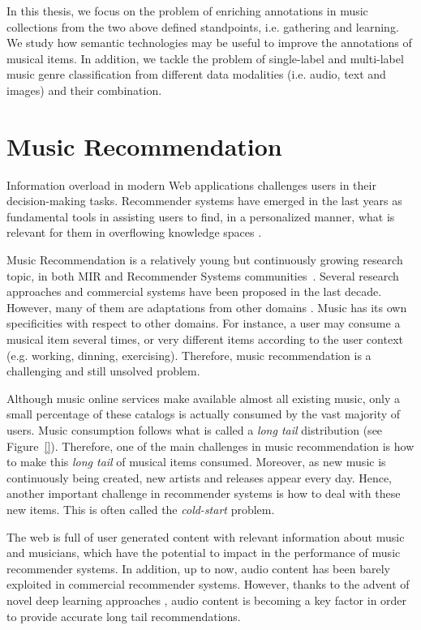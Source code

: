 In this thesis, we focus on the problem of enriching annotations in music collections from the two above defined standpoints, i.e. gathering and learning. We study how semantic technologies may be useful to improve the annotations of musical items. In addition, we tackle the problem of single-label and multi-label music genre classification from different data modalities (i.e. audio, text and images) and their combination.


\section{Music Recommendation}
\label{sec:intro:recommendation}

Information overload in modern Web applications challenges users in their decision-making tasks. Recommender systems have emerged in the last years as fundamental tools in assisting users to find, in a personalized manner, what is relevant for them in overflowing knowledge spaces \cite{TODO}. 

Music Recommendation is a relatively young but continuously growing research topic, in both MIR and Recommender Systems communities~\citep{oscarBook}. Several research approaches and commercial systems have been proposed in the last decade. However, many of them are adaptations from other domains \citep{oscarBook}. 
Music has its own specificities with respect to other domains. For instance, a user may consume a musical item several times, or very different items according to the user context (e.g. working, dinning, exercising). Therefore, music recommendation is a challenging and still unsolved problem.

Although music online services make available almost all existing music, only a small percentage of these catalogs is actually consumed by the vast majority of users. Music consumption follows what is called a \textit{long tail} distribution \citep{oscarBook} (see Figure~\ref{}). Therefore, one of the main challenges in music recommendation is how to make this \textit{long tail} of musical items consumed. Moreover, as new music is continuously being created, new artists and releases appear every day. Hence, another important challenge in recommender systems is how to deal with these new items. This is often called the \textit{cold-start} problem. %

The web is full of user generated content with relevant information about music and musicians, which have the potential to impact in the performance of music recommender systems. In addition, up to now, audio content has been barely exploited in commercial recommender systems. However, thanks to the advent of novel deep learning approaches \citep{Oord2013}, audio content is becoming a key factor in order to provide accurate long tail recommendations.

